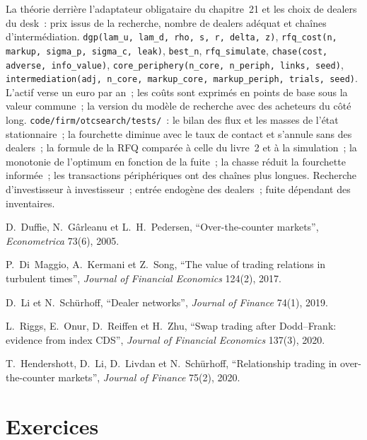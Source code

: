 \begin{build}
 La théorie derrière l'adaptateur obligataire du chapitre~21 et les choix de dealers du desk~: prix issus de la recherche, nombre de dealers adéquat et
chaînes d'intermédiation.
 \texttt{dgp(lam\_u, lam\_d, rho, s, r, delta, z)}, \texttt{rfq\_cost(n, markup, sigma\_p, sigma\_c, leak)}, \texttt{best\_n},
\texttt{rfq\_simulate}, \texttt{chase(cost, adverse, info\_value)}, \texttt{core\_periphery(n\_core, n\_periph, links, seed)},
\texttt{intermediation(adj, n\_core, markup\_core, markup\_periph, trials, seed)}.
 L'actif verse un euro par an~; les coûts sont exprimés en points de base sous la valeur commune~; la version du modèle de recherche avec des acheteurs du côté long.
 \texttt{code/firm/otcsearch/tests/}~: le bilan des flux et les masses de l'état stationnaire~; la fourchette diminue avec le taux de contact et
s'annule sans  des dealers~; la formule de la RFQ comparée à celle du livre~2 et à la simulation~; la monotonie de l'optimum en fonction de la fuite~; la chasse
réduit la fourchette informée~; les transactions périphériques ont des chaînes plus longues.
 Recherche d'investisseur à investisseur~; entrée endogène des dealers~; fuite dépendant des inventaires.
\end{build}

\begin{omsources}
\item D.~Duffie, N.~Gârleanu et L.~H.~Pedersen, ``Over-the-counter markets'', \emph{Econometrica} 73(6), 2005.
\item P.~Di~Maggio, A.~Kermani et Z.~Song, ``The value of trading relations in turbulent times'', \emph{Journal of Financial Economics} 124(2),
2017.
\item D.~Li et N.~Schürhoff, ``Dealer networks'', \emph{Journal of Finance} 74(1), 2019.
\item L.~Riggs, E.~Onur, D.~Reiffen et H.~Zhu, ``Swap trading after Dodd--Frank: evidence from index CDS'', \emph{Journal of Financial Economics}
137(3), 2020.
\item T.~Hendershott, D.~Li, D.~Livdan et N.~Schürhoff, ``Relationship trading in over-the-counter markets'', \emph{Journal of Finance} 75(2), 2020.
\end{omsources}

\section{Exercices}

